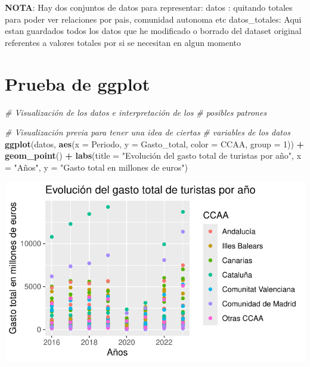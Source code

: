 \documentclass[data,article,submit,moreauthors,pdftex]{Definitions/mdpi}
\newenvironment{Shaded}{\begin{snugshade}}{\end{snugshade}}
\newcommand{\AttributeTok}[1]{\textcolor[rgb]{0.13,0.29,0.53}{#1}}
\newcommand{\CommentTok}[1]{\textcolor[rgb]{0.56,0.35,0.01}{\textit{#1}}}
\newcommand{\DecValTok}[1]{\textcolor[rgb]{0.00,0.00,0.81}{#1}}
\newcommand{\FunctionTok}[1]{\textcolor[rgb]{0.13,0.29,0.53}{\textbf{#1}}}
\newcommand{\NormalTok}[1]{#1}
\newcommand{\SpecialCharTok}[1]{\textcolor[rgb]{0.81,0.36,0.00}{\textbf{#1}}}
\newcommand{\StringTok}[1]{\textcolor[rgb]{0.31,0.60,0.02}{#1}}
\begin{document}
\textbf{NOTA}: Hay dos conjuntos de datos para representar: datos :
quitando totales para poder ver relaciones por pais, comunidad autonoma
etc datos\_totales: Aqui estan guardados todos los datos que he
modificado o borrado del dataset original referentes a valores totales
por si se necesitan en algun momento

\section{Prueba de ggplot}\label{prueba-de-ggplot}

\begin{Shaded}
\begin{Highlighting}[]
\CommentTok{\# Visualización de los datos e interpretación de los}
\CommentTok{\# posibles patrones}

\CommentTok{\# Visualización previa para tener una idea de ciertas}
\CommentTok{\# variables de los datos}
\FunctionTok{ggplot}\NormalTok{(datos, }\FunctionTok{aes}\NormalTok{(}\AttributeTok{x =}\NormalTok{ Periodo, }\AttributeTok{y =}\NormalTok{ Gasto\_total, }\AttributeTok{color =}\NormalTok{ CCAA,}
    \AttributeTok{group =} \DecValTok{1}\NormalTok{)) }\SpecialCharTok{+} \FunctionTok{geom\_point}\NormalTok{() }\SpecialCharTok{+} \FunctionTok{labs}\NormalTok{(}\AttributeTok{title =} \StringTok{"Evolución del gasto total de turistas por año"}\NormalTok{,}
    \AttributeTok{x =} \StringTok{"Años"}\NormalTok{, }\AttributeTok{y =} \StringTok{"Gasto total en millones de euros"}\NormalTok{)}
\end{Highlighting}
\end{Shaded}

\includegraphics{ProyectoAED2024_Rmd_files/figure-latex/unnamed-chunk-29-1.pdf}
\end{document}
